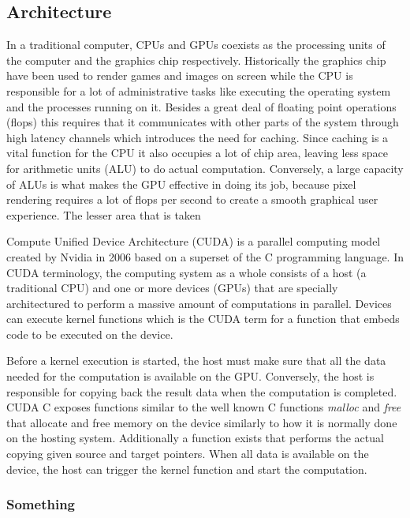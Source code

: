 
\subsection{Architecture}
In a traditional computer, CPUs and GPUs coexists as the processing units of the computer and the graphics chip respectively. Historically the graphics chip have been used to render games and images on screen while the CPU is responsible for a lot of administrative tasks like executing the operating system and the processes running on it. Besides a great deal of floating point operations (flops) this requires that it communicates with other parts of the system through high latency channels which introduces the need for caching. Since caching is a vital function for the CPU it also occupies a lot of chip area, leaving less space for arithmetic units (ALU) to do actual computation. Conversely, a large capacity of ALUs is what makes the GPU effective in doing its job, because pixel rendering requires a lot of flops per second to create a smooth graphical user experience. The lesser area that is taken 


Compute Unified Device Architecture (CUDA) is a parallel computing model created by Nvidia in 2006 based on a superset of the C programming language. In CUDA terminology, the computing system as a whole consists of a host (a traditional CPU) and one or more devices (GPUs) that are specially architectured to perform a massive amount of computations in parallel. Devices can execute kernel functions which is the CUDA term for a function that embeds code to be executed on the device.

Before a kernel execution is started, the host must make sure that all the data needed for the computation is available on the GPU. Conversely, the host is responsible for copying back the result data when the computation is completed. CUDA C exposes functions similar to the well known C functions \emph{malloc} and \emph{free} that allocate and free memory on the device similarly to how it is normally done on the hosting system. Additionally a function exists that performs the actual copying given source and target pointers. When all data is available on the device, the host can trigger the kernel function and start the computation.

\subsubsection{Something}

